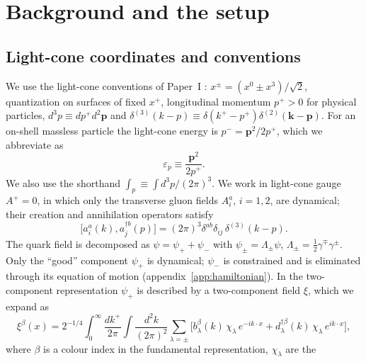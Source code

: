 \documentclass[11pt,a4paper]{article}
\numberwithin{equation}{section}
\newcommand{\eps}{\varepsilon}
\newcommand{\dg}{\dagger}
\newcommand{\dthree}{\delta^{(3)}}
\begin{document}
\section{Background and the setup}
\label{sec:setup}

\subsection{Light-cone coordinates and conventions}
\label{sec:conv}

We use the light-cone conventions of Paper~I \cite{PaperI,Harindranath:1996hq,Burkardt:1995ct}:
$x^{\pm}=(x^{0}\pm x^{3})/\sqrt2$, quantization on surfaces of fixed $x^{+}$, longitudinal momentum
$p^{+}>0$ for physical particles, $d^{3}p\equiv dp^{+}d^{2}\bm p$ and
$\delta^{(3)}(k-p)\equiv\delta(k^{+}-p^{+})\delta^{(2)}(\bm k-\bm p)$. For an on-shell massless
particle the light-cone energy is $p^{-}=\bm p^{2}/2p^{+}$, which we abbreviate as
\begin{equation}
\eps_{p}\equiv\frac{\bm p^{2}}{2p^{+}} .
\label{eq:eps}
\end{equation}
We also use the shorthand $\int_{p}\equiv\int d^{3}p/(2\pi)^{3}$. We work in light-cone gauge
$A^{+}=0$, in which only the transverse gluon fields $A^{a}_{i}$, $i=1,2$, are dynamical; their
creation and annihilation operators satisfy
\begin{equation}
\big[a^{a}_{i}(k),a^{\dg b}_{j}(p)\big]=(2\pi)^{3}\delta^{ab}\delta_{ij}\,\dthree(k-p).
\label{eq:aa}
\end{equation}
The quark field is decomposed as $\psi=\psi_{+}+\psi_{-}$ with $\psi_{\pm}=\Lambda_{\pm}\psi$,
$\Lambda_{\pm}=\tfrac12\gamma^{\mp}\gamma^{\pm}$. Only the ``good'' component $\psi_{+}$ is
dynamical; $\psi_{-}$ is constrained and is eliminated through its equation of motion
(appendix~\ref{app:hamiltonian}). In the two-component representation
\cite{Zhang:1993dd,Brodsky:1997de} $\psi_{+}$ is described by a two-component field $\xi$, which we
expand as
\begin{equation}
\xi^{\beta}(x)=2^{-1/4}\!\int_{0}^{\infty}\!\frac{dk^{+}}{2\pi}\!\int\!\frac{d^{2}k}{(2\pi)^{2}}
\sum_{\lambda=\pm}\Big[b^{\beta}_{\lambda}(k)\,\chi_{\lambda}\,e^{-ik\cdot x}
+d^{\dg\beta}_{\lambda}(k)\,\chi_{\lambda}\,e^{ik\cdot x}\Big],
\label{eq:xi}
\end{equation}
where $\beta$ is a colour index in the fundamental representation, $\chi_{\lambda}$ are the
\end{document}
